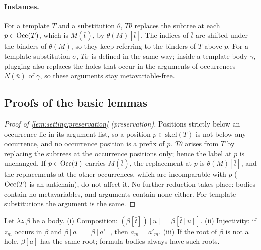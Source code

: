 \paragraph{Instances.}
For a template $T$ and a substitution $\theta$, $T\theta$ replaces the subtree at each $p\in\mathrm{Occ}(T)$, which is $M(\bar t)$, by $\theta(M)[\bar t]$. The indices of $\bar t$ are shifted under the binders of $\theta(M)$, so they keep referring to the binders of $T$ above $p$. For a template substitution $\sigma$, $T\sigma$ is defined in the same way; inside a template body $\gamma$, plugging also replaces the holes that occur in the arguments of occurrences $N(\bar u)$ of $\gamma$, so these arguments stay metavariable-free.

\subsection{Proofs of the basic lemmas}\label{app:setting:lemmas}

\begin{proof}[Proof of \cref{lem:setting:preservation} (preservation)]
Positions strictly below an occurrence lie in its argument list, so a position $p\in\mathrm{skel}(T)$ is not below any occurrence, and no occurrence position is a prefix of $p$. $T\theta$ arises from $T$ by replacing the subtrees at the occurrence positions only; hence the label at $p$ is unchanged. If $p\in\mathrm{Occ}(T)$ carries $M(\bar t)$, the replacement at $p$ is $\theta(M)[\bar t]$, and the replacements at the other occurrences, which are incomparable with $p$ ($\mathrm{Occ}(T)$ is an antichain), do not affect it. No further reduction takes place: bodies contain no metavariables, and arguments contain none either. For template substitutions the argument is the same.
\end{proof}

\begin{lemma}\label{lem:setting:subst}
Let $\lambda\bar z.\beta$ be a body.
\textup{(i)} Composition: $(\beta[\bar t])[\bar u]=\beta[\bar t[\bar u]]$.
\textup{(ii)} Injectivity: if $z_m$ occurs in $\beta$ and $\beta[\bar a]=\beta[\bar a']$, then $a_m=a'_m$.
\textup{(iii)} If the root of $\beta$ is not a hole, $\beta[\bar a]$ has the same root; formula bodies always have such roots.
\end{lemma}

